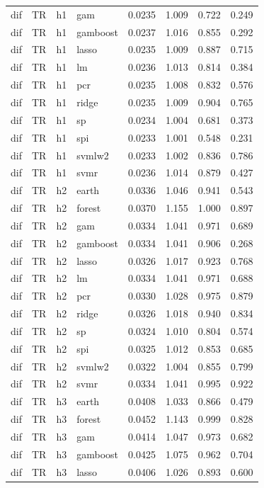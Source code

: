 \begin{ThreePartTable}
\begin{longtable}[t]{llclcccc}
dif & TR & h1 & gam & 0.0235 & 1.009 & 0.722 & 0.249\\
dif & TR & h1 & gamboost & 0.0237 & 1.016 & 0.855 & 0.292\\
dif & TR & h1 & lasso & 0.0235 & 1.009 & 0.887 & 0.715\\
dif & TR & h1 & lm & 0.0236 & 1.013 & 0.814 & 0.384\\
dif & TR & h1 & pcr & 0.0235 & 1.008 & 0.832 & 0.576\\
dif & TR & h1 & ridge & 0.0235 & 1.009 & 0.904 & 0.765\\
dif & TR & h1 & sp & 0.0234 & 1.004 & 0.681 & 0.373\\
dif & TR & h1 & spi & 0.0233 & 1.001 & 0.548 & 0.231\\
dif & TR & h1 & svmlw2 & 0.0233 & 1.002 & 0.836 & 0.786\\
dif & TR & h1 & svmr & 0.0236 & 1.014 & 0.879 & 0.427\\
\addlinespace
dif & TR & h2 & earth & 0.0336 & 1.046 & 0.941 & 0.543\\
dif & TR & h2 & forest & 0.0370 & 1.155 & 1.000 & 0.897\\
dif & TR & h2 & gam & 0.0334 & 1.041 & 0.971 & 0.689\\
dif & TR & h2 & gamboost & 0.0334 & 1.041 & 0.906 & 0.268\\
dif & TR & h2 & lasso & 0.0326 & 1.017 & 0.923 & 0.768\\
dif & TR & h2 & lm & 0.0334 & 1.041 & 0.971 & 0.688\\
dif & TR & h2 & pcr & 0.0330 & 1.028 & 0.975 & 0.879\\
dif & TR & h2 & ridge & 0.0326 & 1.018 & 0.940 & 0.834\\
dif & TR & h2 & sp & 0.0324 & 1.010 & 0.804 & 0.574\\
dif & TR & h2 & spi & 0.0325 & 1.012 & 0.853 & 0.685\\
dif & TR & h2 & svmlw2 & 0.0322 & 1.004 & 0.855 & 0.799\\
dif & TR & h2 & svmr & 0.0334 & 1.041 & 0.995 & 0.922\\
\addlinespace
dif & TR & h3 & earth & 0.0408 & 1.033 & 0.866 & 0.479\\
dif & TR & h3 & forest & 0.0452 & 1.143 & 0.999 & 0.828\\
dif & TR & h3 & gam & 0.0414 & 1.047 & 0.973 & 0.682\\
dif & TR & h3 & gamboost & 0.0425 & 1.075 & 0.962 & 0.704\\
dif & TR & h3 & lasso & 0.0406 & 1.026 & 0.893 & 0.600\\

\end{longtable}
\end{ThreePartTable}

